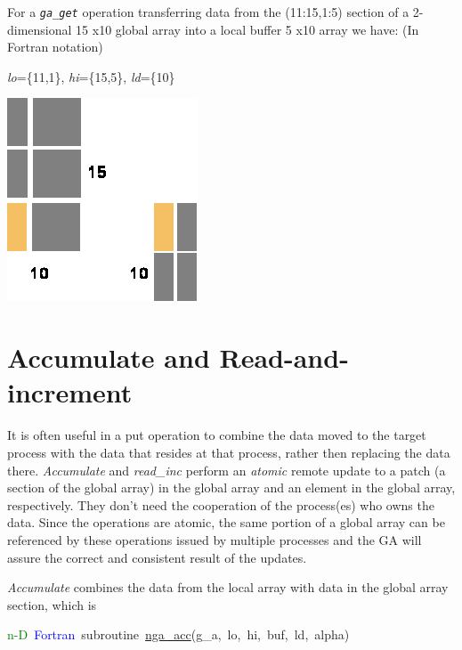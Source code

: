 \textit{}\textit{\emph{\underbar{:}}}

For a \texttt{\emph{ga\_get}} operation transferring data from the
(11:15,1:5) section of a 2-dimensional 15 x10 global array into a
local buffer 5 x10 array we have: (In Fortran notation)

\begin{center}
\emph{lo}=\{11,1\}, \emph{hi}=\{15,5\}, \emph{ld}=\{10\} 
\par\end{center}

\begin{center}
\includegraphics[width=0.4\columnwidth]{GA_get_example}
\par\end{center}


\section{Accumulate and Read-and-increment }

It is often useful in a put operation to combine the data moved to
the target process with the data that resides at that process, rather
then replacing the data there. \emph{Accumulate} and \emph{read\_inc}
perform an \emph{atomic} remote update to a patch (a section of the
global array) in the global array and an element in the global array,
respectively. They don't need the cooperation of the process(es) who
owns the data. Since the operations are atomic, the same portion of
a global array can be referenced by these operations issued by multiple
processes and the GA will assure the correct and consistent result
of the updates.

\emph{Accumulate} combines the data from the local array with data
in the global array section, which is

\textcolor{green}{n-D}~\textcolor{blue}{Fortran}~subroutine~\href{https://hpc.pnl.gov/globalarrays/api/f_op_api.html\#ga_acc}{nga\_{}acc}(g\_a,~lo,~hi,~buf,~ld,~alpha)~

